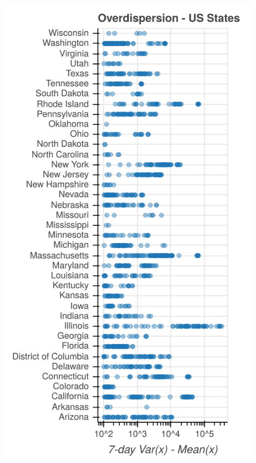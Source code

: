 \documentclass{article}
\begin{document}
\begin{minipage}{.335\linewidth}
\begin{center}
\includegraphics[width=\columnwidth]{img/overdispersion_states.png}
\end{center}
\end{minipage}
\end{document}
